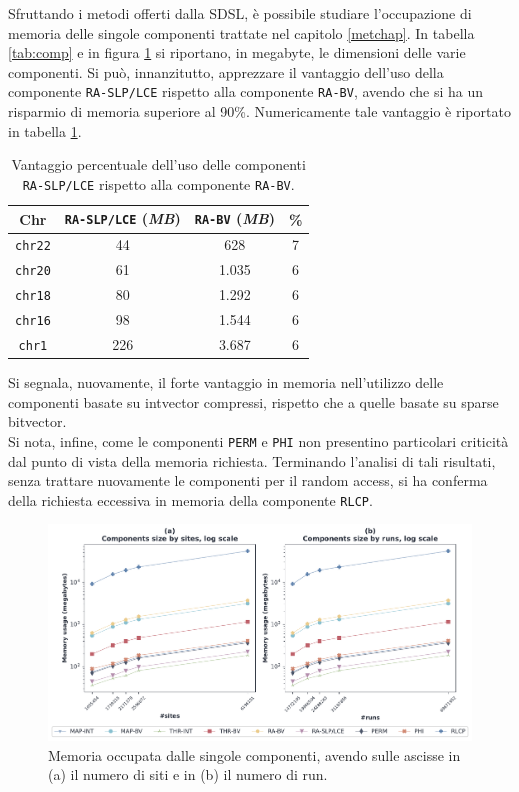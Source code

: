 Sfruttando i metodi offerti dalla SDSL, è possibile studiare
l'occupazione di memoria delle singole componenti trattate nel capitolo
\ref{metchap}. 
In tabella \ref{tab:comp} e in figura \ref{fig:comp}
si riportano, in megabyte, 
le dimensioni delle varie componenti. Si può,
innanzitutto, apprezzare il vantaggio dell'uso della componente
\texttt{RA-SLP/LCE} rispetto alla 
componente \texttt{RA-BV}, avendo che si ha un risparmio di memoria superiore al
90\%. Numericamente tale vantaggio è riportato in tabella
\ref{tab:slppanel}.
\begin{table}
  \centering
  \caption{Vantaggio percentuale dell'uso delle componenti \texttt{RA-SLP/LCE}
    rispetto alla componente \texttt{RA-BV}.}
  \begin{tabular}{c||c|c|c}
    \textbf{Chr} & \textbf{\texttt{RA-SLP/LCE}
                                          (\textit{MB})}
    & \textbf{\texttt{RA-BV} (\textit{MB})} & \textbf{\%}\\
    \hline
    \hline
    \texttt{chr22} & 44 & 628 & 7\\
    \texttt{chr20} & 61 & 1.035 & 6\\
    \texttt{chr18} & 80 & 1.292 & 6\\
    \texttt{chr16} & 98 & 1.544 & 6\\
    \texttt{chr1} & 226 & 3.687 & 6\\
  \end{tabular}
  \label{tab:slppanel}
\end{table}
Si segnala, nuovamente, il
forte vantaggio in memoria nell'utilizzo delle componenti basate su intvector
compressi, rispetto che a quelle basate su sparse bitvector.\\
Si nota, infine, come le componenti \texttt{PERM} e \texttt{PHI} non
presentino particolari criticità dal punto di vista della memoria
richiesta. Terminando l'analisi di tali risultati, senza trattare
nuovamente le componenti per il random access, si ha conferma della
richiesta eccessiva in memoria della componente \texttt{RLCP}.
\begin{figure}
  \centering
    \includegraphics[width=\linewidth]{img/comp_mem.pdf}
  \caption{Memoria occupata dalle singole componenti, avendo sulle ascisse in
    (a) il numero di siti e in (b) il numero di run. }
  \label{fig:comp}
\end{figure}
